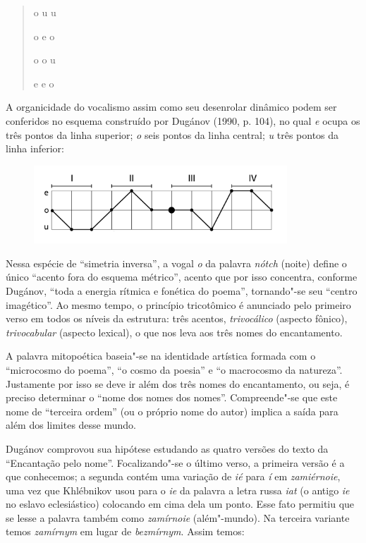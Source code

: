 \begin{verse}
o u u

o e o

o o u

e e o
\end{verse}

A organicidade do vocalismo assim como seu desenrolar dinâmico podem ser
conferidos no esquema construído por Dugánov (1990, p. 104), no qual
\emph{e} ocupa os três pontos da linha superior; \emph{o} seis pontos da
linha central; \emph{u} três pontos da linha inferior:

\begin{figure}[!ht]
\centering
  \includegraphics[width=95mm]{./imgs/grafico3.jpg}
\end{figure}

Nessa espécie de ``simetria inversa'', a vogal \emph{o} da palavra
\emph{nótch} (noite) define o único ``acento fora do esquema métrico'', acento que por isso concentra, conforme
Dugánov, ``toda a energia rítmica e fonética do poema'',
tornando"-se seu ``centro imagético''. Ao mesmo tempo, o princípio
tricotômico é anunciado pelo primeiro verso em todos os níveis
da estrutura: três acentos, \emph{trivocálico} (aspecto fônico),
\emph{trivocabular} (aspecto lexical), o que nos leva aos três nomes do
encantamento.

A palavra mitopoética baseia"-se na identidade artística formada com o
``microcosmo do poema'', ``o cosmo da poesia'' e ``o macrocosmo da natureza''.
Justamente por isso se deve ir além dos três nomes do encantamento, ou seja, é preciso determinar
o ``nome dos nomes dos nomes''. Compreende"-se que este nome de ``terceira ordem'' (ou o próprio nome do autor)
implica a saída para além dos limites desse mundo.

Dugánov comprovou sua hipótese estudando as quatro versões do texto da
``Encantação pelo nome''. Focalizando"-se o último verso, a primeira versão é a que conhecemos; a segunda
contém uma variação de \emph{ié} para \emph{í} em \emph{zamiérnoie}, uma vez
que Khlébnikov usou para o \emph{ie} da palavra a letra
russa \emph{iat} (o antigo \emph{ie} no eslavo eclesiástico)
colocando em cima dela um ponto. Esse fato permitiu que se lesse a
palavra também como \emph{zamírnoie} (além"-mundo). Na terceira
variante temos \emph{zamírnym} em lugar de \emph{bezmírnym}.
Assim temos:

